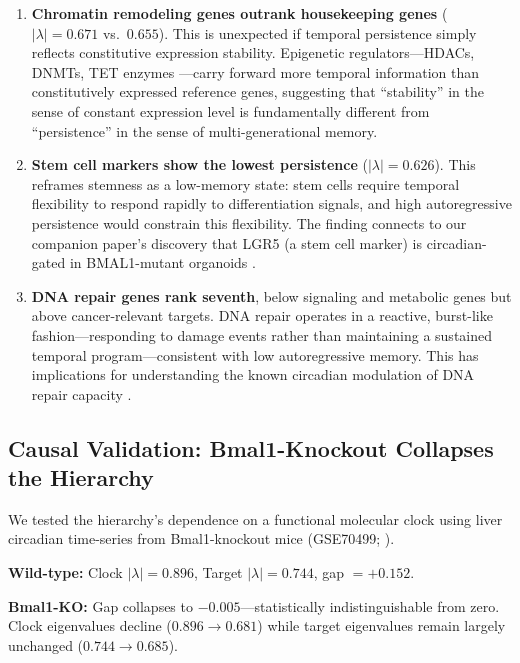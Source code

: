 \documentclass[11pt,letterpaper]{article}
\begin{document}
\begin{enumerate}[noitemsep]
    \item \textbf{Chromatin remodeling genes outrank housekeeping genes} ($|\lambda| = 0.671$ vs.\ $0.655$). This is unexpected if temporal persistence simply reflects constitutive expression stability. Epigenetic regulators---HDACs, DNMTs, TET enzymes \citep{allis2016}---carry forward more temporal information than constitutively expressed reference genes, suggesting that ``stability'' in the sense of constant expression level is fundamentally different from ``persistence'' in the sense of multi-generational memory.

    \item \textbf{Stem cell markers show the lowest persistence} ($|\lambda| = 0.626$). This reframes stemness as a low-memory state: stem cells require temporal flexibility to respond rapidly to differentiation signals, and high autoregressive persistence would constrain this flexibility. The finding connects to our companion paper's discovery that LGR5 (a stem cell marker) is circadian-gated in BMAL1-mutant organoids \citep{whiteside2026paper2}.

    \item \textbf{DNA repair genes rank seventh}, below signaling and metabolic genes but above cancer-relevant targets. DNA repair operates in a reactive, burst-like fashion---responding to damage events rather than maintaining a sustained temporal program---consistent with low autoregressive memory. This has implications for understanding the known circadian modulation of DNA repair capacity \citep{sancar2010}.
\end{enumerate}

\subsection{Causal Validation: Bmal1-Knockout Collapses the Hierarchy}

We tested the hierarchy's dependence on a functional molecular clock using liver circadian time-series from Bmal1-knockout mice (GSE70499; \citet{storch2007}).

\textbf{Wild-type:} Clock $|\lambda| = 0.896$, Target $|\lambda| = 0.744$, gap $= +0.152$.

\textbf{Bmal1-KO:} Gap collapses to $-0.005$---statistically indistinguishable from zero. Clock eigenvalues decline ($0.896 \rightarrow 0.681$) while target eigenvalues remain largely unchanged ($0.744 \rightarrow 0.685$).
\end{document}
